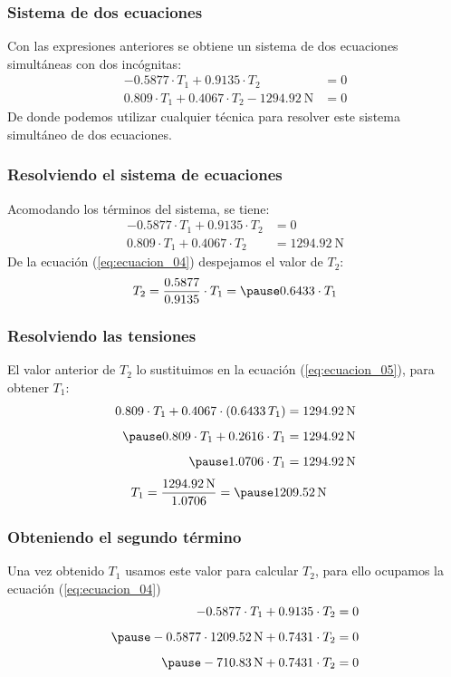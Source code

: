 \documentclass[12pt]{beamer}
\begin{document}
\begin{frame}
\frametitle{Sistema de dos ecuaciones}
Con las expresiones anteriores se obtiene un sistema de dos ecuaciones simultáneas con dos incógnitas:
\pause
\begin{align*}
-0.5877 \cdot T_{1} + 0.9135 \cdot T_{2} &= 0 \\[0.5em]
0.809 \cdot T_{1} + 0.4067 \cdot T_{2} - \SI{1294.92}{\newton} &= 0
\end{align*}
\pause
De donde podemos utilizar cualquier técnica para resolver este sistema simultáneo de dos ecuaciones.
\end{frame}

\begin{frame}
\frametitle{Resolviendo el sistema de ecuaciones}
Acomodando los términos del sistema, se tiene:
\pause
\begin{align}
-0.5877 \cdot T_{1} + 0.9135 \cdot T_{2} &= 0 \label{eq:ecuacion_04} \\[0.5em] 
0.809 \cdot T_{1} + 0.4067 \cdot T_{2} &= \SI{1294.92}{\newton} \label{eq:ecuacion_05}
\end{align}
\pause
De la ecuación (\ref{eq:ecuacion_04}) despejamos el valor de $T_{2}$:
\pause
\begin{eqnarray*}
\begin{aligned}
T_{2} = \dfrac{0.5877}{0.9135} \cdot T_{1} = \pause 0.6433 \cdot T_{1}
\end{aligned}
\end{eqnarray*}
\end{frame}
\begin{frame}
\frametitle{Resolviendo las tensiones}
El valor anterior de $T_{2}$ lo sustituimos en la ecuación (\ref{eq:ecuacion_05}), para obtener $T_{1}$:
\pause
\begin{eqnarray*}
\begin{aligned}
0.809 \cdot T_{1} + 0.4067 \cdot (0.6433 \, T_{1}) &= \SI{1294.92}{\newton} \\[0.5em] \pause
0.809 \cdot T_{1} + 0.2616 \cdot T_{1} &= \SI{1294.92}{\newton} \\[0.5em] \pause
1.0706 \cdot T_{1} &= \SI{1294.92}{\newton}
\end{aligned}
\end{eqnarray*}
\begin{eqnarray*}
T_{1} &= \dfrac{\SI{1294.92}{\newton}}{1.0706} = \pause \SI{1209.52}{\newton}
\end{eqnarray*}
\end{frame}
\begin{frame}
\frametitle{Obteniendo el segundo término}
Una vez obtenido $T_{1}$ usamos este valor para calcular $T_{2}$, para ello ocupamos la ecuación (\ref{eq:ecuacion_04})
\pause
\begin{eqnarray*}
\begin{aligned}
-0.5877 \cdot T_{1} + 0.9135 \cdot T_{2} &= 0 \\[0.5em] \pause
-0.5877 \cdot \SI{1209.52}{\newton} + 0.7431 \cdot T_{2} &= 0 \\[0.5em] \pause
- \SI{710.83}{\newton} + 0.7431 \cdot T_{2} &= 0 \\[0.5em]
\end{aligned}
\end{eqnarray*}
\end{frame}
\end{document}
